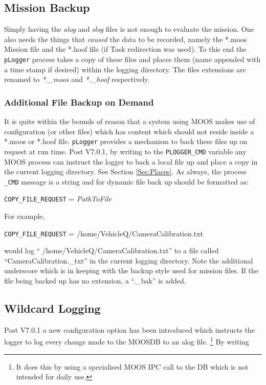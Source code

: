 \documentclass[a4paper,10pt]{article}
\newcommand{\Code}[1]{\texttt{#1} }
\newcommand{\code}[1]{\Code{#1} }
\begin{document}
\subsection{Mission Backup}
Simply having the {\it{alog}} and {\it{slog}} files is not enough
to evaluate the mission. One also needs the things that
{\em{caused}} the data to be recorded, namely the *.moos Mission
file and the *.hoof file (if Task redirection was used). To this
end the \code{pLogger} process takes a copy of these files and
places them (name appended with a time stamp if desired) within
the logging directory. The files extensions are renamed to
{\it{*.\_moos}} and {\it{*.\_hoof}} respectively.

\subsubsection{Additional File Backup on Demand}
It is quite within the bounds of reason that a system using MOOS makes use of
configuration (or other files) which has content which should not reside inside a *.moos or *.hoof file.
\code{pLogger} provides a mechanism to back these files up on request at run time. Post V7.0.1, by writing to the \code{PLOGGER\_CMD}
variable any MOOS process can instruct the logger to back a local file up and place a copy in the current logging directory. See Section \ref{Sec:Places}. As always, the process \code{\_CMD} message is a string and for dynamic file back up should be formatted as:

\begin{center}
\code{COPY\_FILE\_REQUEST} =  \textit{PathToFile}
\end{center}

For example,

\begin{center}
\code{COPY\_FILE\_REQUEST} =  /home/VehicleQ/CameraCalibration.txt
\end{center}

would log `` /home/VehicleQ/CameraCalibration.txt'' to a file called ``CameraCalibration.\_txt'' in the current logging directory. Note the additional underscore which is in keeping with the backup style used for mission files. If the file being backed up has no extension, a ``.\_bak'' is added.

\subsection{Wildcard Logging}

Post V7.0.1 a new configuration option has been introduced which instructs the logger to log every change made to the MOOSDB to an alog file. \footnote{It does this by using a specialised MOOS IPC call to the DB which is not intended for daily use.} By writing
\end{document}
